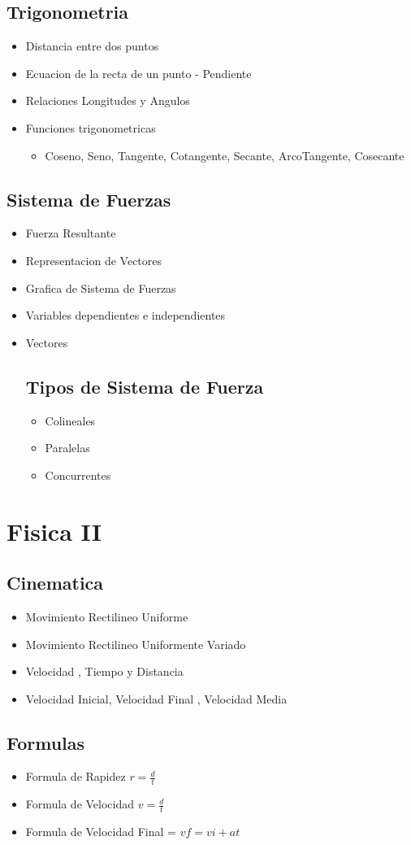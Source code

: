 \documentclass[11pt]{article}
\begin{document}
    \subsection{Trigonometria}
    \begin{itemize}  
      \item Distancia entre dos puntos
      \item Ecuacion de la recta de un punto - Pendiente
      \item Relaciones Longitudes y Angulos
      \item Funciones trigonometricas
        \begin{itemize} 
          \item Coseno, Seno, Tangente, Cotangente, Secante, ArcoTangente, Cosecante
        \end{itemize}
    \end{itemize}
    \subsection{Sistema de Fuerzas}
    \begin{itemize}
      \item Fuerza Resultante
      \item Representacion de Vectores
      \item Grafica de Sistema de Fuerzas
      \item Variables dependientes e independientes
      \item Vectores
      \subsection{Tipos de Sistema de Fuerza}
        \begin{itemize}
          \item Colineales
          \item Paralelas
          \item Concurrentes 
        \end{itemize}
    \end{itemize}
    
\section{Fisica II}
    \subsection{Cinematica}    
      \begin{itemize} 
        \item Movimiento Rectilineo Uniforme 
        \item Movimiento Rectilineo Uniformente Variado
        \item Velocidad , Tiempo y Distancia
        \item Velocidad Inicial, Velocidad Final , Velocidad Media
        \end{itemize} 
        \subsection{Formulas} %
        \begin{itemize} 
          \item Formula de Rapidez $r = \frac{d}{t}$
          \item Formula de Velocidad $v = \frac{d}{t}$
          \item Formula de Velocidad Final = $vf = vi + a t$ 
        \end{itemize}
\end{document}
